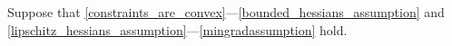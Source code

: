 Suppose that \cref{constraints_are_convex}---\cref{bounded_hessians_assumption} and \cref{lipschitz_hessians_assumption}---\cref{mingradassumption} hold.
